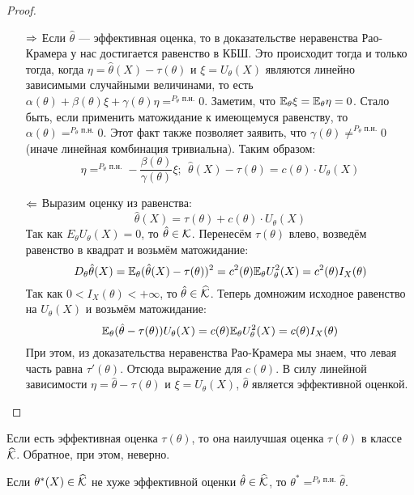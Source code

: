 \begin{proof}~
	\begin{itemize}
		\item[$\Rightarrow$] Если $\hat{\theta}$ --- эффективная оценка, то в доказательстве неравенства Рао-Крамера у нас достигается равенство в КБШ. Это происходит тогда и только тогда, когда $\eta = \hat{\theta}(X) - \tau(\theta)$ и $\xi = U_\theta(X)$ являются линейно зависимыми случайными величинами, то есть $\alpha(\theta) + \beta(\theta)\xi + \gamma(\theta)\eta =^{P_\theta\text{ п.н.}} 0$. Заметим, что $\mathbb{E}_\theta \xi = \mathbb{E}_\theta \eta = 0$. Стало быть, если применить матожидание к имеющемуся равенству, то $\alpha(\theta) =^{P_\theta\text{ п.н.}} 0$. Этот факт также позволяет заявить, что $\gamma(\theta) \neq^{P_\theta\text{ п.н.}} 0$ (иначе линейная комбинация тривиальна). Таким образом:
		\[
			\eta =^{P_\theta\text{ п.н.}} -\frac{\beta(\theta)}{\gamma(\theta)}\xi;\ \ \hat{\theta}(X) - \tau(\theta) = c(\theta) \cdot U_\theta(X)
		\]
		
		\item[$\Leftarrow$] Выразим оценку из равенства:
		\[
			\hat{\theta}(X) = \tau(\theta) + c(\theta) \cdot U_\theta(X)
		\]
		Так как $E_\theta U_\theta(X) = 0$, то $\hat{\theta} \in \mathcal{K}$. Перенесём $\tau(\theta)$ влево, возведём равенство в квадрат и возьмём матожидание:
		\[
			D_\theta \hat{\theta}(X) = \mathbb{E}_\theta (\hat{\theta}(X) - \tau(\theta))^2 = c^2(\theta)\mathbb{E}_\theta U_\theta^2(X) = c^2(\theta)I_X(\theta)
		\]
		Так как $0 < I_X(\theta) < +\infty$, то $\hat{\theta} \in \widehat{\mathcal{K}}$. Теперь домножим исходное равенство на $U_\theta(X)$ и возьмём матожидание:
		\[
			\mathbb{E}_\theta (\hat{\theta} - \tau(\theta))U_\theta(X) = c(\theta) \mathbb{E}_\theta U_\theta^2(X) = c(\theta) I_X(\theta)
		\]
		При этом, из доказательства неравенства Рао-Крамера мы знаем, что левая часть равна $\tau'(\theta)$. Отсюда выражение для $c(\theta)$. В силу линейной зависимости $\eta = \hat{\theta} - \tau(\theta)$ и $\xi = U_\theta(X)$, $\hat{\theta}$ является эффективной оценкой.
	\end{itemize}
\end{proof}

\begin{note}
	Если есть эффективная оценка $\tau(\theta)$, то она наилучшая оценка $\tau(\theta)$ в классе $\widehat{\mathcal{K}}$. Обратное, при этом, неверно.
\end{note}

\begin{corollary}
	Если $\theta^*(X) \in \widehat{\mathcal{K}}$ не хуже эффективной оценки $\hat{\theta} \in \widehat{\mathcal{K}}$, то $\theta^* =^{P_\theta\text{ п.н.}} \hat{\theta}$.
\end{corollary}

